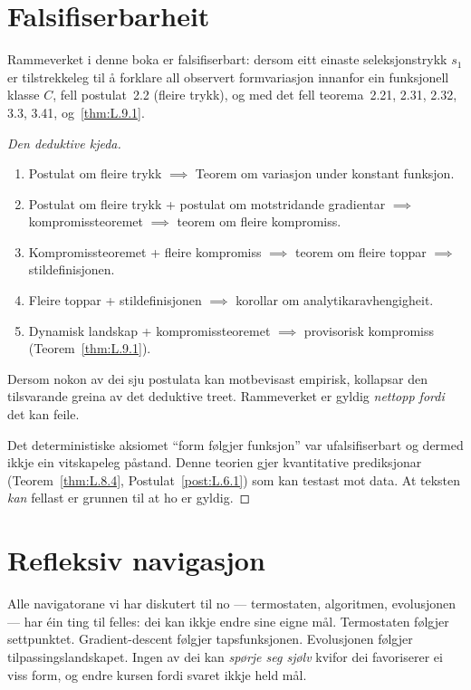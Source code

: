 \section{Falsifiserbarheit}

\begin{satmark}%
\label{thm:L.9.3}
Rammeverket i denne boka er falsifiserbart: dersom eitt einaste
seleksjonstrykk $s_1$ er tilstrekkeleg til å forklare all
observert formvariasjon innanfor ein funksjonell klasse $C$, fell
postulat~2.2 (fleire trykk), og med det fell teorema~2.21, 2.31,
2.32, 3.3, 3.41, og~\ref{thm:L.9.1}.
\end{satmark}

\begin{proof}[Den deduktive kjeda]
\begin{enumerate}[nosep]
  \item Postulat om fleire trykk $\implies$ Teorem om variasjon
    under konstant funksjon.
  \item Postulat om fleire trykk + postulat om motstridande
    gradientar $\implies$ kompromissteoremet $\implies$ teorem
    om fleire kompromiss.
  \item Kompromissteoremet + fleire kompromiss $\implies$ teorem
    om fleire toppar $\implies$ stildefinisjonen.
  \item Fleire toppar + stildefinisjonen $\implies$ korollar om
    analytikaravhengigheit.
  \item Dynamisk landskap + kompromissteoremet $\implies$
    provisorisk kompromiss (Teorem~\ref{thm:L.9.1}).
\end{enumerate}
Dersom nokon av dei sju postulata kan motbevisast empirisk,
kollapsar den tilsvarande greina av det deduktive treet.
Rammeverket er gyldig \emph{nettopp fordi} det kan feile.

Det deterministiske aksiomet ``form følgjer funksjon'' var
ufalsifiserbart og dermed ikkje ein vitskapeleg påstand. Denne
teorien gjer kvantitative prediksjonar
(Teorem~\ref{thm:L.8.4}, Postulat~\ref{post:L.6.1}) som kan
testast mot data. At teksten \emph{kan} fellast er grunnen til at
ho er gyldig.
\end{proof}


\section{Refleksiv navigasjon}

Alle navigatorane vi har diskutert til no --- termostaten,
algoritmen, evolusjonen --- har éin ting til felles: dei kan ikkje
endre sine eigne mål. Termostaten følgjer settpunktet.
Gradient-descent følgjer tapsfunksjonen. Evolusjonen følgjer
tilpassingslandskapet. Ingen av dei kan \emph{spørje seg sjølv}
kvifor dei favoriserer ei viss form, og endre kursen fordi svaret
ikkje held mål.

